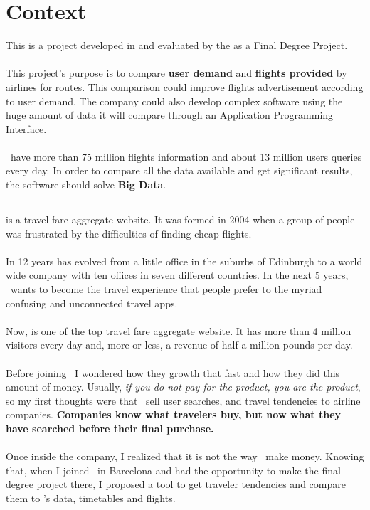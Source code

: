 
\chapter{Context}

\label{chapter01}

This is a project developed in \textit{\company} and evaluated by the \textit{\univname} as a Final Degree Project.
\\\\
This project's purpose is to compare \textbf{user demand} and \textbf{flights provided} by airlines for routes. This comparison could improve flights advertisement according to user demand. The company could also develop complex software using the huge amount of data it will compare through an Application Programming Interface\cite{api}.
\\\\
\company\ have more than 75 million flights information and about 13 million users queries every day. In order to compare all the data available and get significant results, the software should solve  \textbf{Big Data}.


\section{\company}

\company\cite{skyscanner_strategy} is a travel fare aggregate website. It was formed in 2004 when a group of people was frustrated by the difficulties of finding cheap flights.
\\\\
In 12 years has evolved from a little office in the suburbs of Edinburgh to a world wide company with ten offices in seven different countries. In the next 5 years, \company\ wants to become the travel experience that people prefer to the myriad confusing and unconnected travel apps.
\\\\
Now, is one of the top travel fare aggregate website. It has more than 4 million visitors every day and, more or less, a revenue of half a million pounds per day.
\\\\
Before joining \company\ I wondered how they growth that fast and how they did this amount of money. Usually, \textit{if you do not pay for the product, you are the product}, so my first thoughts were that \company\ sell user searches, and travel tendencies to airline companies. \textbf{Companies know what travelers buy, but now what they have searched before their final purchase.}
\\\\
Once inside the company, I realized that it is not the way \company\ make money. Knowing that, when I joined \squad\ in Barcelona and had the opportunity to make the final degree project there, I proposed a tool to get traveler tendencies and compare them to \squad's data, timetables and flights.

